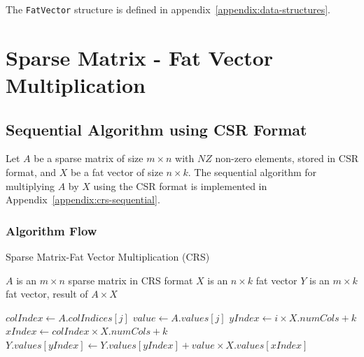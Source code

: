 \documentclass[12pt,oneside]{book} %
\begin{document}
The \texttt{FatVector} structure is defined in
appendix~\ref{appendix:data-structures}.

\newpage
\section{Sparse Matrix - Fat Vector Multiplication}

\subsection{Sequential Algorithm using CSR Format}

Let \( A \) be a sparse matrix of size \( m \times n \) with \( NZ \) non-zero
elements, stored in CSR format, and \( X \) be a fat vector of size \( n \times
k \). The sequential algorithm for multiplying \( A \) by \( X \) using the CSR
format is implemented in Appendix~\ref{appendix:crs-sequential}.

\subsubsection{Algorithm Flow}

\begin{algorithm}[H]
    \caption{Sparse Matrix-Fat Vector Multiplication (CRS)}
    \begin{algorithmic}
        \Require $A$ is an $m \times n$ sparse matrix in CRS format
        \Require $X$ is an $n \times k$ fat vector
        \Ensure  $Y$ is an $m \times k$ fat vector, result of $A \times X$

        \State $colIndex \gets A.colIndices[j]$
        \State $value \gets A.values[j]$
        \State $yIndex \gets i \times X.numCols + k$
        \State $xIndex \gets colIndex \times X.numCols + k$
        \State $Y.values[yIndex] \gets Y.values[yIndex] + value \times X.values[xIndex]$
        \EndFor
        \EndFor
        \EndFor
    \end{algorithmic}
\end{algorithm}
\end{document}
